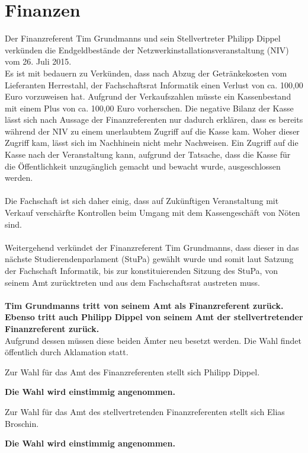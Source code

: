 \documentclass[a4paper, 11pt]{article} %
\begin{document}
\section{Finanzen}
Der Finanzreferent Tim Grundmanns und sein Stellvertreter Philipp Dippel verkünden die Endgeldbestände der Netzwerkinstallationsveranstaltung (NIV) vom 26. Juli 2015. \\ Es ist mit bedauern zu Verkünden, dass nach Abzug der Getränkekosten vom Lieferanten Herrestahl, der Fachschaftsrat Informatik einen Verlust von ca. 100,00 Euro vorzuweisen hat. Aufgrund der Verkaufszahlen müsste ein Kassenbestand mit einem Plus von ca. 100,00 Euro vorherschen. Die negative Bilanz der Kasse lässt sich nach Aussage der Finanzreferenten nur dadurch erklären, dass es bereits während der NIV zu einem unerlaubtem Zugriff auf die Kasse kam. Woher dieser Zugriff kam, lässt sich im Nachhinein nicht mehr Nachweisen. Ein Zugriff auf die  Kasse nach der Veranstaltung kann, aufgrund der Tatsache, dass die Kasse für die Öffentlichkeit unzugänglich gemacht und bewacht wurde, ausgeschlossen werden.\\\\ Die Fachschaft ist sich daher einig, dass auf Zukünftigen Veranstaltung mit Verkauf verschärfte Kontrollen beim Umgang mit dem Kassengeschäft von Nöten sind.
\\\\
Weitergehend verkündet der Finanzreferent Tim Grundmanns, dass dieser in das nächste Studierendenparlament (StuPa) gewählt wurde und somit laut Satzung der Fachschaft Informatik, bis zur konstituierenden Sitzung des StuPa, von seinem Amt zurücktreten und aus dem Fachschaftsrat austreten muss.
\\\\ \textbf{Tim Grundmanns tritt von seinem Amt als Finanzreferent zurück. Ebenso tritt auch Philipp Dippel von seinem Amt der stellvertretender Finanzreferent zurück.}
\\

\noindent Aufgrund dessen müssen diese beiden Ämter neu besetzt werden. Die Wahl findet öffentlich durch Aklamation statt.
\vspace{1em}
\par\noindent
Zur Wahl für das Amt des Finanzreferenten stellt sich Philipp Dippel.
\begin{center}
	\textbf{Die Wahl wird einstimmig angenommen.}
\end{center}

\par\noindent
Zur Wahl für das Amt des stellvertretenden Finanzreferenten stellt sich Elias Broschin.
\begin{center}
	\textbf{Die Wahl wird einstimmig angenommen.}
\end{center}
\end{document}
